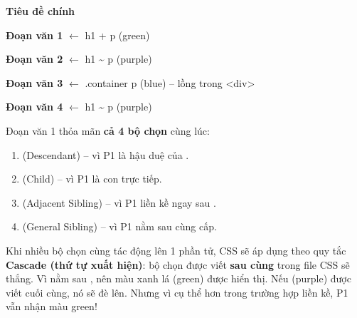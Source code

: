 \begin{browserWindow}
\sffamily\small
{\bfseries\Large Tiêu đề chính} \par\vspace{4pt}
\textcolor{tipBorder}{\textbf{Đoạn văn 1}} \textcolor{gray!60}{\scriptsize $\leftarrow$ h1 + p (green)} \par\vspace{2pt}
\textcolor{purple!70}{\textbf{Đoạn văn 2}} \textcolor{gray!60}{\scriptsize $\leftarrow$ h1 \textasciitilde{} p (purple)} \par\vspace{2pt}
\begin{tcolorbox}[arc=2pt, colback=gray!3, colframe=gray!25, boxrule=0.5pt, boxsep=2pt, left=10pt]
\textcolor{primaryBlue}{\textbf{Đoạn văn 3}} \textcolor{gray!60}{\scriptsize $\leftarrow$ .container p (blue) -- lồng trong <div>}
\end{tcolorbox}\vspace{2pt}
\textcolor{purple!70}{\textbf{Đoạn văn 4}} \textcolor{gray!60}{\scriptsize $\leftarrow$ h1 \textasciitilde{} p (purple)}
\end{browserWindow}

\begin{noteBox}
Đoạn văn 1 thỏa mãn \textbf{cả 4 bộ chọn} cùng lúc:
\begin{enumerate}[leftmargin=1.5em, itemsep=2pt, parsep=0pt]
    \item {} (Descendant) -- vì P1 là hậu duệ của .
    \item {} (Child) -- vì P1 là con trực tiếp.
    \item {} (Adjacent Sibling) -- vì P1 liền kề ngay sau .
    \item {} (General Sibling) -- vì P1 nằm sau  cùng cấp.
\end{enumerate}
Khi nhiều bộ chọn cùng tác động lên 1 phần tử, CSS sẽ áp dụng theo quy tắc \textbf{Cascade (thứ tự xuất hiện)}: bộ chọn được viết \textbf{sau cùng} trong file CSS sẽ thắng. Vì  nằm sau , nên màu xanh lá (green) được hiển thị. Nếu  (purple) được viết cuối cùng, nó sẽ đè lên. Nhưng vì  cụ thể hơn  trong trường hợp liền kề, P1 vẫn nhận màu green!
\end{noteBox}

